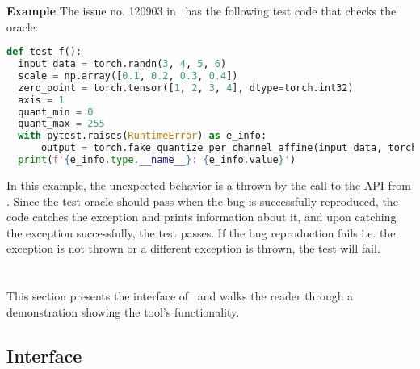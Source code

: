 \documentclass[sigconf,screen]{acmart}
\begin{document}
\textbf{Example}
  The issue no. 120903 in \torch\ has the following test code that checks the oracle:
\vspace{-1ex}
\begin{lstlisting}[language=python,basicstyle=\small,]
def test_f():
  input_data = torch.randn(3, 4, 5, 6)
  scale = np.array([0.1, 0.2, 0.3, 0.4])
  zero_point = torch.tensor([1, 2, 3, 4], dtype=torch.int32)
  axis = 1
  quant_min = 0
  quant_max = 255
  with pytest.raises(RuntimeError) as e_info:
      output = torch.fake_quantize_per_channel_affine(input_data, torch.from_numpy(scale), zero_point, axis, quant_min, quant_max)
  print(f'{e_info.type.__name__}: {e_info.value}')
\end{lstlisting}
\vspace{-1ex}
In this example, the unexpected behavior is a  thrown by the call to the  API from \torch. Since the test oracle should pass when the bug is successfully reproduced, the code catches the exception and prints information about it, and upon catching the exception successfully, the test passes. If the bug reproduction fails i.e. the exception is not thrown or a different exception is thrown, the test will fail.

\vspace{-1ex}
\section{\tname} %

This section presents the interface of \tname\ and walks the reader
through a demonstration showing the tool's functionality.


\subsection{Interface}
\end{document}
